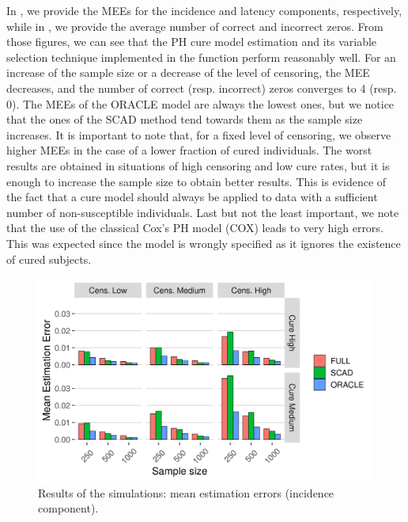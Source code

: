 In , we provide the MEEs for the incidence and latency components, respectively, while in , we provide the average number of correct and incorrect zeros.
From those figures, we can see that the PH cure model estimation and its variable selection technique implemented in the  function perform reasonably well. 
For an increase of the sample size or a decrease of the level of censoring, the MEE decreases, and the number of correct (resp. incorrect) zeros converges to 4 (resp. 0).
The MEEs of the ORACLE model are always the lowest ones, but we notice that the ones of the SCAD method tend towards them as the sample size increases.
It is important to note that, for a fixed level of censoring, we observe higher MEEs in the case of a lower fraction of cured individuals. 
The worst results are obtained in situations of high censoring and low cure rates, but it is enough to increase the sample size to obtain better results.
This is evidence of the fact that a cure model should always be applied to data with a sufficient number of non-susceptible individuals.
Last but not the least important, we note that the use of the classical Cox's PH model (COX) leads to very high errors. 
This was expected since the model is wrongly specified as it ignores the existence of cured subjects.


\begin{figure}[hb!]
  \centering
  \includegraphics[scale=0.83]{fig_errors_CURE.png}
  \caption{Results of the simulations: mean estimation errors (incidence component).}
  \label{figure:errors_CURE}
\end{figure}


